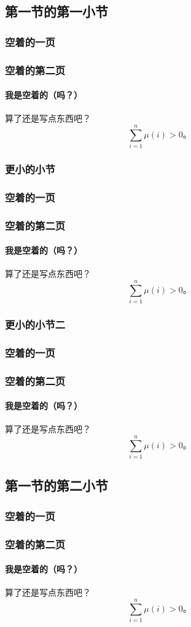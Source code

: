 \documentclass{../pkslide}
\begin{document}
\subsection{第一节的第一小节}

\begin{frame}
  \frametitle{空着的一页}
\end{frame}

\begin{frame}
  \frametitle{空着的第二页}
  \framesubtitle{我是空着的（吗？）}
  算了还是写点东西吧？
  \[ \sum_{i = 1}^{n} \mu(i) > 0 \text{。} \]
\end{frame}

\subsubsection{更小的小节}

\begin{frame}
  \frametitle{空着的一页}
\end{frame}

\begin{frame}
  \frametitle{空着的第二页}
  \framesubtitle{我是空着的（吗？）}
  算了还是写点东西吧？
  \[ \sum_{i = 1}^{n} \mu(i) > 0 \text{。} \]
\end{frame}

\subsubsection{更小的小节二}

\begin{frame}
  \frametitle{空着的一页}
\end{frame}

\begin{frame}
  \frametitle{空着的第二页}
  \framesubtitle{我是空着的（吗？）}
  算了还是写点东西吧？
  \[ \sum_{i = 1}^{n} \mu(i) > 0 \text{。} \]
\end{frame}

\subsection{第一节的第二小节}

\begin{frame}
  \frametitle{空着的一页}
\end{frame}

\begin{frame}
  \frametitle{空着的第二页}
  \framesubtitle{我是空着的（吗？）}
  算了还是写点东西吧？
  \[ \sum_{i = 1}^{n} \mu(i) > 0 \text{。} \]
\end{frame}
\end{document}
